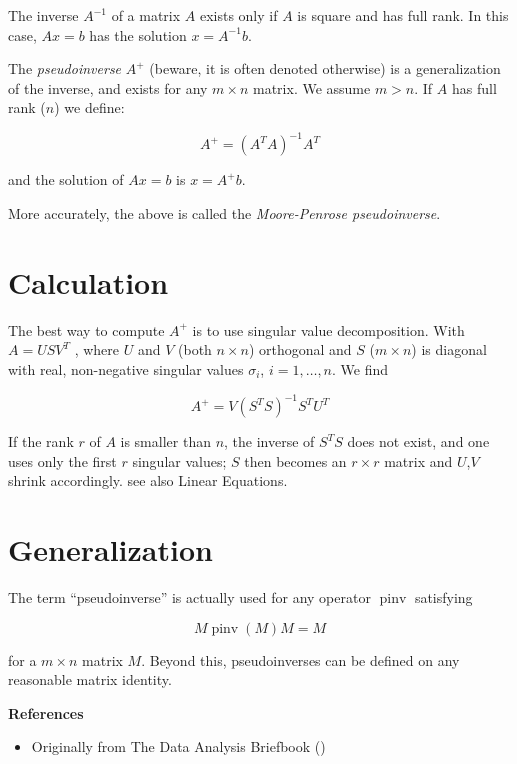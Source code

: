 \documentclass[12pt]{article}
\begin{document}
The inverse $A^{-1}$ of a matrix $A$ exists only if $A$ is square and has full rank. In this case, $Ax = b$ has the solution $x = A^{-1}b$.

The \emph{pseudoinverse} $A^+$ (beware, it is often denoted otherwise) is a generalization of the inverse, and exists for any $m \times n$ matrix. We assume $m > n$. If $A$ has full rank ($n$) we define:

$$ A^+ = (A^T A)^{-1} A^T $$

and the solution of $Ax = b$ is $x = A^+b$.

More accurately, the above is called the \emph{Moore-Penrose pseudoinverse}.

\section{Calculation}

The best way to compute $A^+$ is to use singular value decomposition. With $A=USV^T$ , where $U$ and $V$ (both $n \times n$) orthogonal and $S$ ($m \times n$) is diagonal with real, non-negative singular values $\sigma_i$, $i=1,\ldots,n$.  We find 

$$ A^+ = V(S^TS)^{-1}S^TU^T $$

If the rank $r$ of $A$ is smaller than $n$, the inverse of $S^TS$ does not exist, and one uses only the first $r$ singular values; $S$ then becomes an $r \times r$ matrix and $U$,$V$ shrink accordingly. see also Linear Equations.

\section{Generalization}

The term ``pseudoinverse'' is actually used for any operator $\operatorname{pinv}$ satisfying

$$ M \operatorname{pinv}(M) M = M $$

for a $m \times n$ matrix $M$.  Beyond this, pseudoinverses can be 
defined on any reasonable matrix identity.

{\bf References}

\begin{itemize}
\item Originally from The Data Analysis Briefbook
()
\end{itemize}
\end{document}
